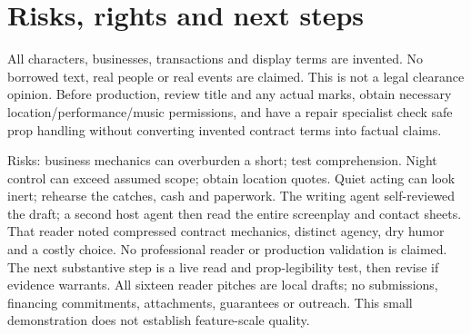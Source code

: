 \section{Risks, rights and next steps}
All characters, businesses, transactions and display terms are invented. No borrowed text, real people or real events are claimed. This is not a legal clearance opinion. Before production, review title and any actual marks, obtain necessary location/performance/music permissions, and have a repair specialist check safe prop handling without converting invented contract terms into factual claims.

Risks: business mechanics can overburden a short; test comprehension. Night control can exceed assumed scope; obtain location quotes. Quiet acting can look inert; rehearse the catches, cash and paperwork. The writing agent self-reviewed the draft; a second host agent then read the entire screenplay and contact sheets. That reader noted compressed contract mechanics, distinct agency, dry humor and a costly choice. No professional reader or production validation is claimed. The next substantive step is a live read and prop-legibility test, then revise if evidence warrants. All sixteen reader pitches are local drafts; no submissions, financing commitments, attachments, guarantees or outreach. This small demonstration does not establish feature-scale quality.
